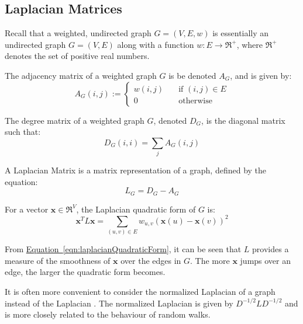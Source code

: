 \subsection{Laplacian Matrices}
\label{sec:laplacianMatrices}
\nocite{Berkeley:1999}
\nocite{Pati:2011}
\nocite{Spielman:2006}
Recall that a weighted, undirected graph $G = (V,E,w)$ is essentially an 
undirected graph $G = (V,E)$ along with a function $w : E \rightarrow 
\Re^{+}$, where $\Re^{+}$ denotes the set of positive real numbers.

The adjacency matrix of a weighted graph $G$ is be denoted $A_{G}$, and is
given by:
\begin{equation}
A_{G}(i,j) := 
    \left\{
        \begin{array}{ll}
            \mathit{w}(i,j) &   \quad \text{if $(i,j) \in E$} \\
            0 &                 \quad \text{otherwise}
        \end{array}
    \right.
\end{equation}

The degree matrix of a weighted graph $G$, denoted $D_{G}$, is the diagonal 
matrix such that:
\begin{equation}
D_{G}(i,i) = \sum_{j} A_{G}(i,j)
\end{equation}

A Laplacian Matrix is a matrix representation of a graph, defined by the
equation:
\begin{equation}
L_{G} = D_{G} - A_{G}
\end{equation}

For a vector $\textbf{x} \in \Re^{V}$, the Laplacian quadratic form of $G$ is:
\begin{equation}
\label{eqn:laplacianQuadraticForm}
\textbf{x}^{T} L \textbf{x} = \sum_{(u,v) \in E} w_{u,v}(\textbf{x}(u) - \textbf{x}(v))^2
\end{equation}

From \hyperref[eqn:laplacianQuadraticForm]
{Equation~\ref{eqn:laplacianQuadraticForm}}, it can be seen that $L$ provides a 
measure of the smoothness of $\textbf{x}$ over the edges in $G$. The more 
$\textbf{x}$ jumps over an edge, the larger the quadratic form becomes.

It is often more convenient to consider the normalized Laplacian of a graph 
instead of the Laplacian \cite{Spielman:2010}. The normalized Laplacian is given
by $D^{-1/2}LD^{-1/2}$ and is more closely related to the behaviour of random 
walks.

